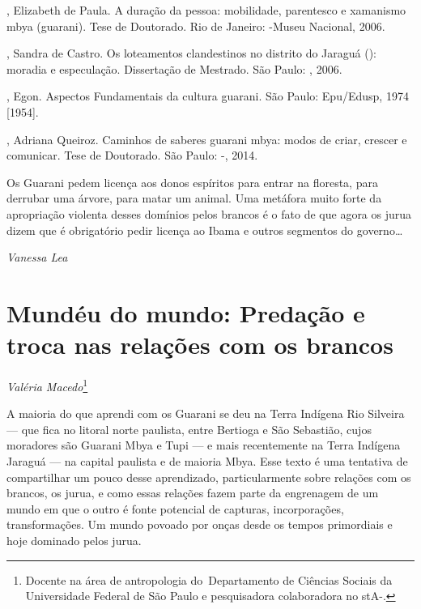 \begin{Parskip}
, Elizabeth de Paula. A duração da pessoa: mobilidade,
parentesco e xamanismo mbya (guarani). Tese de Doutorado. Rio de
Janeiro: -Museu Nacional, 2006.  

, Sandra de Castro. Os loteamentos clandestinos no distrito do
Jaraguá (): moradia e especulação. Dissertação de Mestrado. São
Paulo: , 2006.

, Egon. Aspectos Fundamentais da cultura guarani. São Paulo:
Epu/Edusp, 1974 [1954].

, Adriana Queiroz. Caminhos de saberes guarani mbya: modos de
criar, crescer e comunicar. Tese de Doutorado. São Paulo: -,
2014.
\end{Parskip}

Os Guarani pedem licença aos donos espíritos para entrar na floresta,
para derrubar uma árvore, para matar um animal. Uma metáfora muito
forte da apropriação violenta desses domínios pelos brancos é o fato de
que agora os jurua dizem que é obrigatório pedir licença ao Ibama e
outros segmentos do governo\ldots{}
\medskip
\begin{flushright}
\emph{Vanessa Lea}
\end{flushright}

\chapter{Mundéu do mundo: Predação e troca nas relações com os brancos} 
\begin{flushright}
\emph{Valéria Macedo}\footnote{Docente na área de antropologia
do~Departamento de Ciências Sociais da Universidade Federal de São
Paulo e pesquisadora colaboradora no stA-.}
\end{flushright}
\medskip

A maioria do que aprendi com os Guarani se deu na Terra Indígena Rio
Silveira — que fica no litoral norte paulista, entre Bertioga e São
Sebastião, cujos moradores são Guarani Mbya e Tupi — e mais
recentemente na Terra Indígena Jaraguá — na capital paulista e de
maioria Mbya. Esse texto é uma tentativa de compartilhar um pouco desse
aprendizado, particularmente sobre relações com os brancos, os jurua, e
como essas relações fazem parte da engrenagem de um mundo em que o
outro é fonte potencial de capturas, incorporações, transformações. Um
mundo povoado por onças desde os tempos primordiais e hoje dominado
pelos jurua. 

